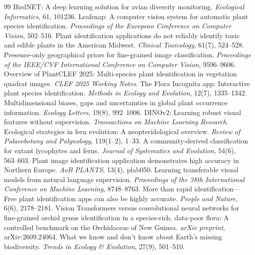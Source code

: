 \documentclass[preprint,12pt,authoryear]{elsarticle}
\begin{document}
\begin{thebibliography}{99}
 BirdNET: A deep learning solution for avian diversity monitoring. \emph{Ecological Informatics}, 61, 101236.
 Leafsnap: A computer vision system for automatic plant species identification. \emph{Proceedings of the European Conference on Computer Vision}, 502--516.
 Plant identification applications do not reliably identify toxic and edible plants in the American Midwest. \emph{Clinical Toxicology}, 61(7), 524--528.
 Presence-only geographical priors for fine-grained image classification. \emph{Proceedings of the IEEE/CVF International Conference on Computer Vision}, 9596--9606.
 Overview of PlantCLEF 2025: Multi-species plant identification in vegetation quadrat images. \emph{CLEF 2025 Working Notes}.
 The Flora Incognita app: Interactive plant species identification. \emph{Methods in Ecology and Evolution}, 12(7), 1335--1342.
 Multidimensional biases, gaps and uncertainties in global plant occurrence information. \emph{Ecology Letters}, 19(8), 992--1006.
 DINOv2: Learning robust visual features without supervision. \emph{Transactions on Machine Learning Research}.
 Ecological strategies in fern evolution: A neopteridological overview. \emph{Review of Palaeobotany and Palynology}, 119(1--2), 1--33.
 A community-derived classification for extant lycophytes and ferns. \emph{Journal of Systematics and Evolution}, 54(6), 563--603.
 Plant image identification application demonstrates high accuracy in Northern Europe. \emph{AoB PLANTS}, 13(4), plab050.
 Learning transferable visual models from natural language supervision. \emph{Proceedings of the 38th International Conference on Machine Learning}, 8748--8763.
 More than rapid identification---Free plant identification apps can also be highly accurate. \emph{People and Nature}, 6(6), 2178--2181.
 Vision Transformers versus convolutional neural networks for fine-grained orchid genus identification in a species-rich, data-poor flora: A controlled benchmark on the Orchidaceae of New Guinea. \emph{arXiv preprint}, arXiv:2609.24064.
 What we know and don't know about Earth's missing biodiversity. \emph{Trends in Ecology \& Evolution}, 27(9), 501--510.

\end{thebibliography}
\end{document}
